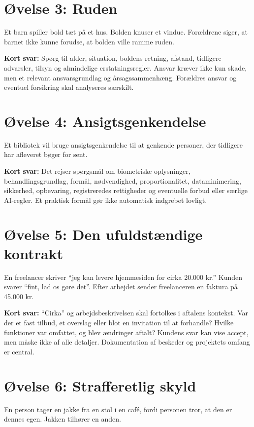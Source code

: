 \section{Øvelse 3: Ruden}

Et barn spiller bold tæt på et hus. Bolden knuser et vindue. Forældrene siger, at barnet ikke kunne forudse, at bolden ville ramme ruden.

\textbf{Kort svar:} Spørg til alder, situation, boldens retning, afstand, tidligere advarsler, tilsyn og almindelige erstatningsregler. Ansvar kræver ikke kun skade, men et relevant ansvarsgrundlag og årsagssammenhæng. Forældres ansvar og eventuel forsikring skal analyseres særskilt.

\section{Øvelse 4: Ansigtsgenkendelse}

Et bibliotek vil bruge ansigtsgenkendelse til at genkende personer, der tidligere har afleveret bøger for sent.

\textbf{Kort svar:} Det rejser spørgsmål om biometriske oplysninger, behandlingsgrundlag, formål, nødvendighed, proportionalitet, dataminimering, sikkerhed, opbevaring, registreredes rettigheder og eventuelle forbud eller særlige AI-regler. Et praktisk formål gør ikke automatisk indgrebet lovligt.

\section{Øvelse 5: Den ufuldstændige kontrakt}

En freelancer skriver ``jeg kan levere hjemmesiden for cirka 20.000 kr.'' Kunden svarer ``fint, lad os gøre det''. Efter arbejdet sender freelanceren en faktura på 45.000 kr.

\textbf{Kort svar:} ``Cirka'' og arbejdsbeskrivelsen skal fortolkes i aftalens kontekst. Var der et fast tilbud, et overslag eller blot en invitation til at forhandle? Hvilke funktioner var omfattet, og blev ændringer aftalt? Kundens svar kan vise accept, men måske ikke af alle detaljer. Dokumentation af beskeder og projektets omfang er central.

\section{Øvelse 6: Strafferetlig skyld}

En person tager en jakke fra en stol i en café, fordi personen tror, at den er dennes egen. Jakken tilhører en anden.

